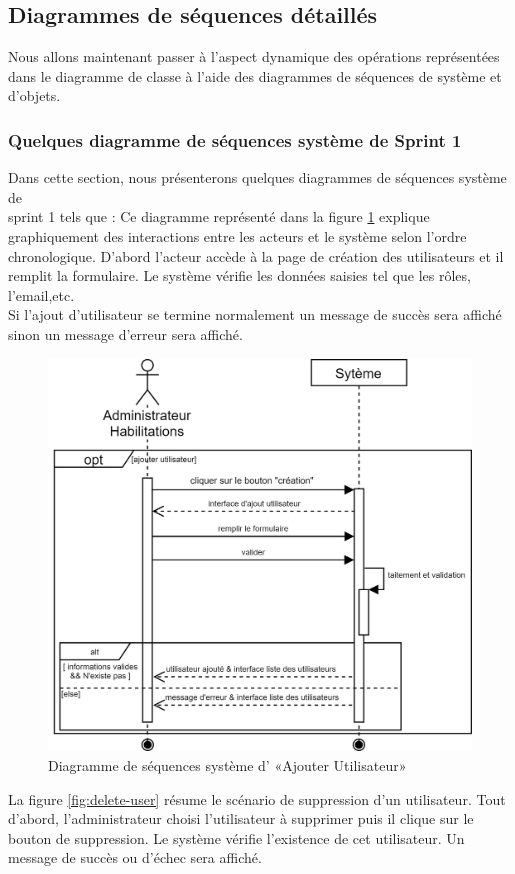 \subsection{Diagrammes de séquences détaillés}
Nous allons maintenant passer à l’aspect dynamique des opérations représentées dans le diagramme de classe à l’aide des diagrammes de séquences de système et d’objets.
\subsubsection{Quelques diagramme de séquences système de Sprint 1}
Dans cette section, nous présenterons quelques diagrammes de séquences système de \\sprint 1 tels que : \newpage
{}\label{ajout-user}
Ce diagramme représenté dans la figure \ref{fig:add-user} explique graphiquement des interactions entre les acteurs et le système selon l'ordre chronologique. D'abord l'acteur accède à la page de création des utilisateurs et il remplit la formulaire. Le système vérifie les données saisies tel que les rôles, l'email,etc.\\Si l'ajout d'utilisateur se termine normalement un message de succès sera affiché sinon un message d'erreur sera affiché.
\begin{figure}[H]
	\centering
	\includegraphics[width=0.65\linewidth]{img/conception/sequences/add-user}
	\caption[Diagramme de séquences système d’ «Ajouter Utilisateur»]{Diagramme de séquences système d’ «Ajouter Utilisateur»}
	\label{fig:add-user}
\end{figure}
\newpage
{}
La figure \ref{fig:delete-user} résume le scénario de suppression d'un utilisateur. Tout d'abord, l'administrateur choisi l'utilisateur à supprimer puis il clique sur le bouton de suppression. Le système vérifie l'existence de cet utilisateur. Un message de succès ou d'échec sera affiché.

